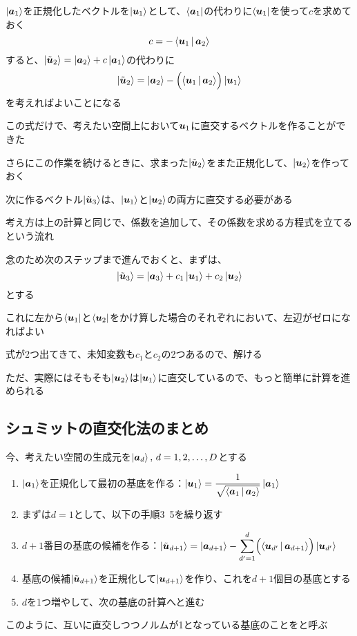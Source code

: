 \documentclass[../book_half_step_linear]{subfiles}
\begin{document}
\br

$\ket{\vb*{a}_1}$を正規化したベクトルを$\ket{\vb*{u}_1}$として、$\bra{\vb*{a}_1}$の代わりに$\bra{\vb*{u}_1}$を使って$c$を求めておく
\begin{equation*}
  c = -\Braket{\vb*{u}_1|\vb*{a}_2}
\end{equation*}
すると、$\Ket{\tilde{\vb*{u}}_2} = \Ket{\vb*{a}_2} + c \Ket{\vb*{a}_1}$の代わりに
\begin{equation*}
  \Ket{\tilde{\vb*{u}}_2} = \Ket{\vb*{a}_2} - \Bigl( \Braket{\vb*{u}_1|\vb*{a}_2} \Bigr) \Ket{\vb*{u}_1}
\end{equation*}
を考えればよいことになる

この式だけで、考えたい空間上において$\vb*{u}_1$に直交するベクトルを作ることができた

\br

さらにこの作業を続けるときに、求まった$\Ket{\tilde{\vb*{u}}_2}$をまた正規化して、$\ket{\vb*{u}_2}$を作っておく

次に作るベクトル$\Ket{\tilde{\vb*{u}}_3}$は、$\ket{\vb*{u}_1}$と$\ket{\vb*{u}_2}$の両方に直交する必要がある

考え方は上の計算と同じで、係数を追加して、その係数を求める方程式を立てるという流れ

\br

念のため次のステップまで進んでおくと、まずは、
\begin{equation*}
  \Ket{\tilde{\vb*{u}}_3} = \Ket{\vb*{a}_3} + c_1 \Ket{\vb*{u}_1} + c_2 \Ket{\vb*{u}_2}
\end{equation*}
とする

これに左から$\bra{\vb*{u}_1}$と$\bra{\vb*{u}_2}$をかけ算した場合のそれぞれにおいて、左辺がゼロになればよい

式が2つ出てきて、未知変数も$c_1$と$c_2$の2つあるので、解ける

ただ、実際にはそもそも$\ket{\vb*{u}_2}$は$\ket{\vb*{u}_1}$に直交しているので、もっと簡単に計算を進められる

\sectionline
\subsection{シュミットの直交化法のまとめ}

今、考えたい空間の生成元を$\ket{\vb*{a}_d}, \, d = 1, 2, \ldots, D$とする
\begin{enumerate}
  \item $\ket{\vb*{a}_1}$を正規化して最初の基底を作る：$\ket{\vb*{u}_1} = \dfrac{1}{\sqrt{\Braket{\vb*{a}_1|\vb*{a}_2}}}\Ket{\vb*{a}_1}$
  \item まずは$d=1$として、以下の手順3~5を繰り返す
  \item $d+1$番目の基底の候補を作る：$\Ket{\tilde{\vb*{u}}_{d+1}} = \Ket{\vb*{a}_{d+1}} - \displaystyle\sum_{d'=1}^{d} \Bigl( \Braket{\vb*{u}_{d'}|\vb*{a}_{d+1}}\Bigr) \Ket{\vb*{u}_{d'}}$
  \item 基底の候補$\Ket{\tilde{\vb*{u}}_{d+1}}$を正規化して$\ket{\vb*{u}_{d+1}}$を作り、これを$d+1$個目の基底とする
  \item $d$を1つ増やして、次の基底の計算へと進む
\end{enumerate}
このように、互いに直交しつつノルムが1となっている基底のことをと呼ぶ
\end{document}
